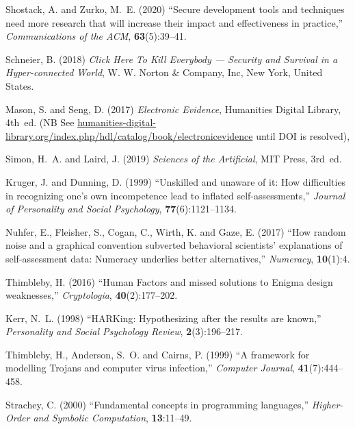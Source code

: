 \documentclass[10pt,a4paper]{article}
\begin{document}
{\begin{thebibliography}{10}
Shostack, A. and Zurko, M.~E. (2020) ``Secure development tools and techniques
  need more research that will increase their impact and effectiveness in
  practice,'' {\em Communications of the ACM}, \textbf{63}(5):39--41.
\newblock {}

Schneier, B. (2018) {\em Click Here To Kill Everybody --- Security and Survival
  in a Hyper-connected World}, W. W. Norton {\&} Company, Inc, New York, United
  States.

Mason, S. and Seng, D. (2017) {\em Electronic Evidence}, Humanities Digital
  Library, 4th~ed.
\newblock (NB See
  \url{humanities-digital-library.org/index.php/hdl/catalog/book/electronicevidence}
  until DOI is resolved), 

Simon, H.~A. and Laird, J. (2019) {\em Sciences of the Artificial}, MIT Press,
  3rd~ed.

Kruger, J. and Dunning, D. (1999) ``Unskilled and unaware of it: {How}
  difficulties in recognizing one's own incompetence lead to inflated
  self-assessments,'' {\em Journal of Personality and Social Psychology},
  \textbf{77}(6):1121--1134.
\newblock {}

Nuhfer, E., Fleisher, S., Cogan, C., Wirth, K. and Gaze, E. (2017) ``How random
  noise and a graphical convention subverted behavioral scientists'
  explanations of self-assessment data: {Numeracy} underlies better
  alternatives,'' {\em Numeracy}, \textbf{10}(1):4.
\newblock {}

Thimbleby, H. (2016) ``{Human Factors} and missed solutions to {Enigma} design
  weaknesses,'' {\em Cryptologia}, \textbf{40}(2):177--202.
\newblock {}

Kerr, N.~L. (1998) ``{HARKing}: {H}ypothesizing after the results are known,''
  {\em Personality and Social Psychology Review}, \textbf{2}(3):196--217.
\newblock {}

Thimbleby, H., Anderson, S.~O. and Cairns, P. (1999) ``A framework for
  modelling {Trojans} and computer virus infection,'' {\em Computer Journal},
  \textbf{41}(7):444--458.
\newblock {}

Strachey, C. (2000) ``Fundamental concepts in programming languages,'' {\em
  Higher-Order and Symbolic Computation}, \textbf{13}:11--49.
\newblock {}


\end{thebibliography}}
\end{document}
